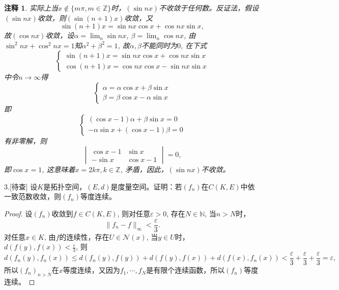 \documentclass[a4paper,8pt]{ctexart}\textwidth 140mm \textheight 216mm
\newtheorem{Remark}{注释}[section]
\newcommand{\e}{\varepsilon}
\newcommand{\8}{\infty}
\begin{document}
\begin{Remark}
	实际上当$x\notin\{m\pi, m\in\mathbb{Z}\}$时，$(\sin nx)$不收敛于任何数。反证法，假设$(\sin nx)$收敛，则$(\sin(n+1)x)$收敛，又
	$$\sin(n+1)x=\sin nx\cos x+\cos nx\sin x,$$
	故$(\cos nx)$收敛，设$\alpha=\lim_{n}\sin nx$, $\beta=\lim_n\cos nx$, 由$\sin^2 nx+\cos^2 nx=1$知$\alpha^2+\beta^2=1$, 故$\alpha,\beta$不能同时为$0$, 在下式
	\begin{equation*}
	\begin{cases}
	\sin(n+1)x=\sin nx\cos x+\cos nx\sin x\\
	\cos(n+1)x=\cos nx\cos x-\sin nx\sin x
	\end{cases}
	\end{equation*}
	中令$n\to\infty$得
	\begin{equation*}
	\begin{cases}
	\alpha=\alpha\cos x+\beta\sin x\\
	\beta=\beta\cos x-\alpha\sin x
	\end{cases}
	\end{equation*}
	即
	\begin{equation*}
	\begin{cases}
	(\cos x-1)\alpha+\beta\sin x=0\\
	-\alpha\sin x+(\cos x-1)\beta=0
	\end{cases}
	\end{equation*}
	有非零解，则
	\begin{equation*}
	\begin{vmatrix}
	\cos x-1 & \sin x\\-\sin x & \cos x-1
	\end{vmatrix}=0,
	\end{equation*}
	即$\cos x=1$, 这意味着$x=2k\pi,k\in \mathbb{Z}$, 矛盾，因此，$(\sin nx)$不收敛。
\end{Remark}

3.[待查] 设$K$是拓扑空间，$(E,d)$是度量空间。证明：若$(f_n)$在$C(K,E)$中依一致范数收敛，则$(f_n)$等度连续。
\begin{proof}
	设$(f_n)$收敛到$f\in C(K,E)$, 则对任意$\e>0$, 存在$N\in \mathbb{N}$, 当$n>N$时，$$\|f_n-f\|_\infty<\frac{\e}{3}.$$ 
	对任意$x\in K$, 由$f$的连续性，存在$U\in\mathcal{N}(x)$, 当$y\in U$时，$d(f(y),f(x))<\frac{\e}{3}$, 则
	\[d(f_n(y),f_n(x))\leq d(f_n(y),f(y))+d(f(y),f(x))+d(f(x),f_n(x))<\frac{\e}{3}+\frac{\e}{3}+\frac{\e}{3}=\e,
	\] 
	所以$(f_n)_{n>N}$在$x$等度连续，又因为$f_1,\cdots,f_N$是有限个连续函数，所以$(f_n)$等度连续。
\end{proof}
\end{document}
